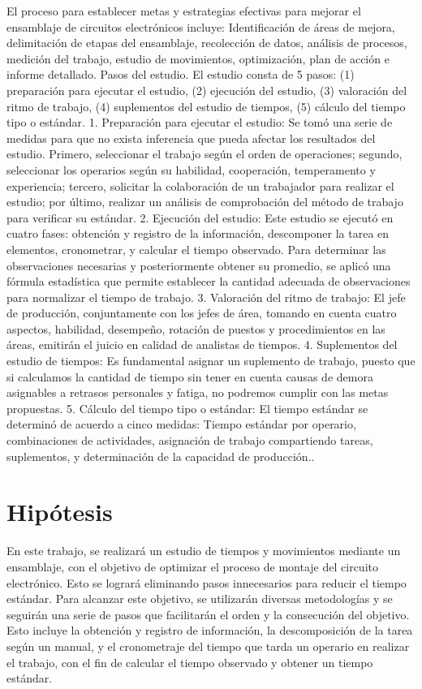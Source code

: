     El proceso para establecer metas y estrategias efectivas para mejorar el ensamblaje de circuitos electrónicos incluye:
    Identificación de áreas de mejora, delimitación de etapas del ensamblaje, recolección de datos, análisis de procesos, medición del trabajo, estudio de movimientos, optimización, plan de acción e informe detallado.
    Pasos del estudio. 
    El estudio consta de 5 pasos: (1) preparación para ejecutar el estudio, (2) ejecución del estudio, (3) valoración del ritmo de trabajo, (4) suplementos del estudio de tiempos, (5) cálculo del tiempo tipo o estándar.
    1. Preparación para ejecutar el estudio:
    Se tomó una serie de medidas para que no exista inferencia que pueda afectar los resultados del estudio. Primero, seleccionar el trabajo según el orden de operaciones; segundo, seleccionar los operarios según su habilidad, cooperación, temperamento y experiencia; tercero, solicitar la colaboración de un trabajador para realizar el estudio; por último, realizar un análisis de comprobación del método de trabajo para verificar su estándar.
    2. Ejecución del estudio:
    Este estudio se ejecutó en cuatro fases: obtención y registro de la información, descomponer la tarea en elementos, cronometrar, y calcular el tiempo observado. Para determinar las observaciones necesarias y posteriormente obtener su promedio, se aplicó una fórmula estadística que permite establecer la cantidad adecuada de observaciones para normalizar el tiempo de trabajo.
    3. Valoración del ritmo de trabajo:
    El jefe de producción, conjuntamente con los jefes de área, tomando en cuenta cuatro aspectos, habilidad, desempeño, rotación de puestos y procedimientos en las áreas, emitirán el juicio en calidad de analistas de tiempos.
    4. Suplementos del estudio de tiempos:
    Es fundamental asignar un suplemento de trabajo, puesto que si calculamos la cantidad de tiempo sin tener en cuenta causas de demora asignables a retrasos personales y fatiga, no podremos cumplir con las metas propuestas.
    5. Cálculo del tiempo tipo o estándar:
    El tiempo estándar se determinó de acuerdo a cinco medidas: Tiempo estándar por operario, combinaciones de actividades, asignación de trabajo compartiendo tareas, suplementos, y determinación de la capacidad de producción.\cite{Fundamentaciónteórica}.
    \section{Hipótesis}
    
    En este trabajo, se realizará un estudio de tiempos y movimientos mediante un ensamblaje, con el objetivo de optimizar el proceso de montaje del circuito electrónico. Esto se logrará eliminando pasos innecesarios para reducir el tiempo estándar. Para alcanzar este objetivo, se utilizarán diversas metodologías y se seguirán una serie de pasos que facilitarán el orden y la consecución del objetivo. Esto incluye la obtención y registro de información, la descomposición de la tarea según un manual, y el cronometraje del tiempo que tarda un operario en realizar el trabajo, con el fin de calcular el tiempo observado y obtener un tiempo estándar.
    
